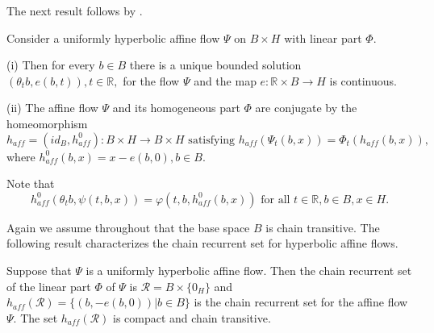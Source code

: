 	The next result follows by \cite[Corollary 1 and Theorem 2.5]{ColSan11}.
	
	\begin{theorem}
		\label{Theorem5.1}Consider a uniformly hyperbolic affine flow $\Psi$ on
		$B\times H$ with linear part $\Phi$.
		
		(i) Then for every $b\in B$ there is a unique bounded solution $(\theta
		_{t}b,e(b,t)),\allowbreak t\in\mathbb{R},$ for the flow $\Psi$ and the map
		$e:\mathbb{R}\times B\rightarrow H$ is continuous.
		
		(ii) The affine flow $\Psi$ and its homogeneous part $\Phi$ are conjugate by
		the homeomorphism
		\[
		h_{aff}=(id_{B},h_{aff}^{0}):B\times H\rightarrow B\times H\mbox{ satisfying
		}h_{aff}(\Psi_{t}(b,x))=\Phi_{t}(h_{aff}(b,x)),
		\]
		where $h_{aff}^{0}(b,x)=x-e(b,0),b\in B$.
	\end{theorem}
	
	Note that
	\[
	h_{aff}^{0}(\theta_{t}b,\psi(t,b,x))=\varphi(t,b,h_{aff}^{0}(b,x))\mbox{ for
		all }t\in\mathbb{R},b\in B,x\in H.
	\]
	
	
	Again we assume throughout that the base space $B$ is chain transitive. The
	following result characterizes the chain recurrent set for hyperbolic affine flows.
	
	\begin{theorem}
		\label{Theorem_hyperbolic1}Suppose that $\Psi$ is a uniformly hyperbolic
		affine flow. Then the chain recurrent set of the linear part $\Phi$ of $\Psi$
		is $\mathcal{R}=B\times\{0_{H}\}$ and $h_{aff}(\mathcal{R}%
		)=\{(b,-e(b,0))\left\vert b\in B\right.  \}$ is the chain recurrent set for
		the affine flow $\Psi$. The set $h_{aff}(\mathcal{R})$ is compact and chain transitive.
	\end{theorem}
	
